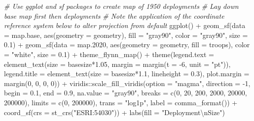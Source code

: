 \documentclass[
]{book}
\newenvironment{Shaded}{\begin{snugshade}}{\end{snugshade}}
\newcommand{\AttributeTok}[1]{\textcolor[rgb]{0.77,0.63,0.00}{#1}}
\newcommand{\CommentTok}[1]{\textcolor[rgb]{0.56,0.35,0.01}{\textit{#1}}}
\newcommand{\DecValTok}[1]{\textcolor[rgb]{0.00,0.00,0.81}{#1}}
\newcommand{\FloatTok}[1]{\textcolor[rgb]{0.00,0.00,0.81}{#1}}
\newcommand{\FunctionTok}[1]{\textcolor[rgb]{0.00,0.00,0.00}{#1}}
\newcommand{\NormalTok}[1]{#1}
\newcommand{\SpecialCharTok}[1]{\textcolor[rgb]{0.00,0.00,0.00}{#1}}
\newcommand{\StringTok}[1]{\textcolor[rgb]{0.31,0.60,0.02}{#1}}
\theoremstyle{definition}
\theoremstyle{definition}
\theoremstyle{definition}
\theoremstyle{definition}
\theoremstyle{remark}
\begin{document}
\begin{Shaded}
\begin{Highlighting}[]
\CommentTok{\# Use ggplot and sf packages to create map of 1950 deployments}
\CommentTok{\# Lay down base map first then deployments}
\CommentTok{\# Note the application of the coordinate reference system below to alter projection from default}
\FunctionTok{ggplot}\NormalTok{() }\SpecialCharTok{+}
  \FunctionTok{geom\_sf}\NormalTok{(}\AttributeTok{data =}\NormalTok{ map.base, }\FunctionTok{aes}\NormalTok{(}\AttributeTok{geometry =}\NormalTok{ geometry), }\AttributeTok{fill =} \StringTok{"gray90"}\NormalTok{, }\AttributeTok{color =} \StringTok{"gray90"}\NormalTok{, }\AttributeTok{size =} \FloatTok{0.1}\NormalTok{) }\SpecialCharTok{+}
  \FunctionTok{geom\_sf}\NormalTok{(}\AttributeTok{data =}\NormalTok{ map}\FloatTok{.2020}\NormalTok{, }\FunctionTok{aes}\NormalTok{(}\AttributeTok{geometry =}\NormalTok{ geometry, }\AttributeTok{fill =}\NormalTok{ troops), }\AttributeTok{color =} \StringTok{"white"}\NormalTok{, }\AttributeTok{size =} \FloatTok{0.1}\NormalTok{) }\SpecialCharTok{+}
  \FunctionTok{theme\_flynn\_map}\NormalTok{() }\SpecialCharTok{+}
  \FunctionTok{theme}\NormalTok{(}\AttributeTok{legend.text =} \FunctionTok{element\_text}\NormalTok{(}\AttributeTok{size =}\NormalTok{ basesize}\SpecialCharTok{*}\FloatTok{1.05}\NormalTok{, }\AttributeTok{margin =} \FunctionTok{margin}\NormalTok{(}\AttributeTok{t =} \SpecialCharTok{{-}}\DecValTok{6}\NormalTok{, }\AttributeTok{unit =} \StringTok{"pt"}\NormalTok{)),}
        \AttributeTok{legend.title =} \FunctionTok{element\_text}\NormalTok{(}\AttributeTok{size =}\NormalTok{ basesize}\SpecialCharTok{*}\FloatTok{1.1}\NormalTok{, }\AttributeTok{lineheight =} \FloatTok{0.3}\NormalTok{),}
        \AttributeTok{plot.margin =} \FunctionTok{margin}\NormalTok{(}\DecValTok{0}\NormalTok{, }\DecValTok{0}\NormalTok{, }\DecValTok{0}\NormalTok{, }\DecValTok{0}\NormalTok{)) }\SpecialCharTok{+}
\NormalTok{  viridis}\SpecialCharTok{::}\FunctionTok{scale\_fill\_viridis}\NormalTok{(}\AttributeTok{option =} \StringTok{"magma"}\NormalTok{, }\AttributeTok{direction =} \SpecialCharTok{{-}}\DecValTok{1}\NormalTok{, }\AttributeTok{begin =} \FloatTok{0.1}\NormalTok{, }\AttributeTok{end =} \FloatTok{0.9}\NormalTok{, }\AttributeTok{na.value =} \StringTok{"gray90"}\NormalTok{, }\AttributeTok{breaks =} \FunctionTok{c}\NormalTok{(}\DecValTok{0}\NormalTok{, }\DecValTok{20}\NormalTok{, }\DecValTok{200}\NormalTok{, }\DecValTok{2000}\NormalTok{, }\DecValTok{20000}\NormalTok{, }\DecValTok{200000}\NormalTok{), }\AttributeTok{limits =} \FunctionTok{c}\NormalTok{(}\DecValTok{0}\NormalTok{, }\DecValTok{200000}\NormalTok{), }\AttributeTok{trans =} \StringTok{"log1p"}\NormalTok{, }\AttributeTok{label =} \FunctionTok{comma\_format}\NormalTok{()) }\SpecialCharTok{+}
  \FunctionTok{coord\_sf}\NormalTok{(}\AttributeTok{crs =} \FunctionTok{st\_crs}\NormalTok{(}\StringTok{"ESRI:54030"}\NormalTok{)) }\SpecialCharTok{+}
  \FunctionTok{labs}\NormalTok{(}\AttributeTok{fill =} \StringTok{"Deployment}\SpecialCharTok{\textbackslash{}n}\StringTok{Size"}\NormalTok{)}
\end{Highlighting}
\end{Shaded}
\end{document}
